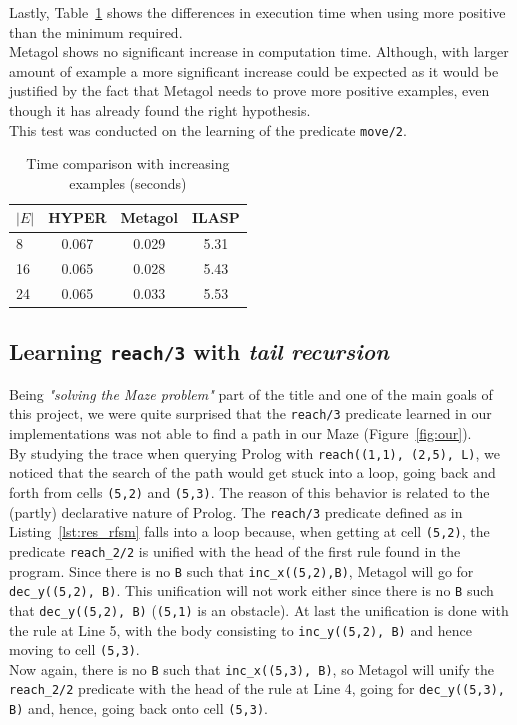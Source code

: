 Lastly, Table~\ref{tab:ex_cmp} shows the differences in execution time when using more positive than the minimum required.\\
Metagol shows no significant increase in computation time. Although, with larger amount of example a more significant increase could be expected as it would be justified by the fact that Metagol needs to prove more positive examples, even though it has already
found the right hypothesis.\\
This test was conducted on the learning of the predicate \texttt{move/2}.

{
\begin{center}
    \begin{table}[h]
    \centering
    \begin{tabular}{ |l|c|c|c| } 
        \hline
        \(|E|\) & \textbf{HYPER} & \textbf{Metagol} & \textbf{ILASP} \\ \hline
        8 & 0.067 & 0.029 & 5.31 \\ 
        16 & 0.065 & 0.028 & 5.43 \\
        24 & 0.065 & 0.033 & 5.53 \\  
        \hline
    \end{tabular}
    \caption{\label{tab:ex_cmp}Time comparison with increasing examples (seconds)}
\end{table}
\end{center}
}

\subsection{Learning \texttt{reach/3} with \emph{tail recursion}}
Being \emph{"solving the Maze problem"} part of the title and one of the main goals of this project, we were
quite surprised that the \texttt{reach/3} predicate learned in our implementations was not able to find a path
in our Maze (Figure~\ref{fig:our}).\\
By studying the trace when querying Prolog with \texttt{reach((1,1), (2,5), L)},
we noticed that the search of the path would get stuck into a loop, going back and forth from cells \texttt{(5,2)} and
\texttt{(5,3)}. The reason of this behavior is related to the (partly) declarative nature of Prolog. The \texttt{reach/3}
predicate defined as in Listing~\ref{lst:res_rfsm} falls into a loop because, when getting at cell \texttt{(5,2)},
the predicate \texttt{reach\_2/2} is unified with the head of the first rule found in the program. Since there is
no \texttt{B} such that \texttt{inc\_x((5,2),B)}, Metagol will go for \texttt{dec\_y((5,2), B)}. This unification
will not work either since there is no \texttt{B} such that \texttt{dec\_y((5,2), B)} (\texttt{(5,1)} is an obstacle). At
last the unification is done with the rule at Line 5, with the body consisting to \texttt{inc\_y((5,2), B)} and hence moving
to cell \texttt{(5,3)}.\\
Now again, there is no \texttt{B} such that \texttt{inc\_x((5,3), B)}, so Metagol will unify the
\texttt{reach\_2/2} predicate with the head of the rule at Line 4, going for \texttt{dec\_y((5,3), B)} and, hence,
going back onto cell \texttt{(5,3)}.\\

